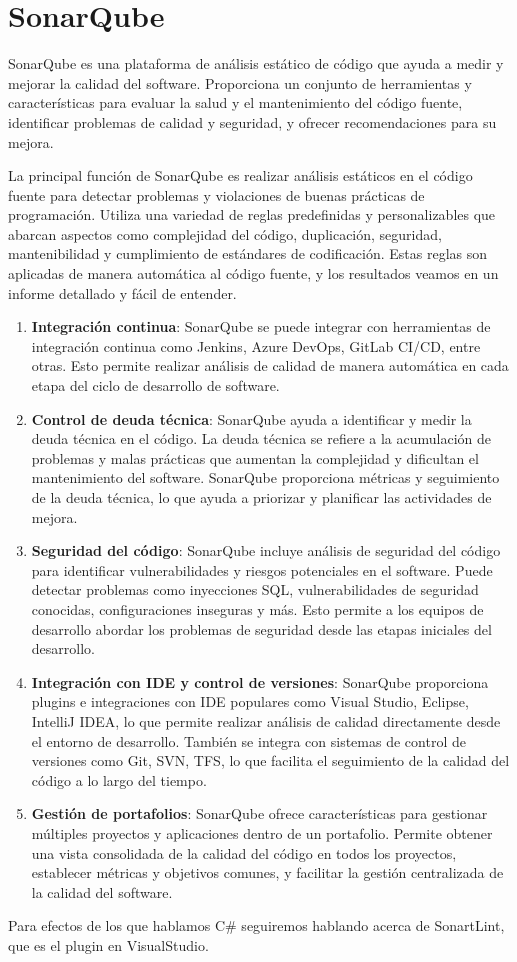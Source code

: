 \documentclass[executivepaper]{article}
\begin{document}
\section{SonarQube}
SonarQube es una plataforma de análisis estático de código que ayuda a medir y mejorar la calidad del software. Proporciona un conjunto de herramientas y características para evaluar la salud y el mantenimiento del código fuente, identificar problemas de calidad y seguridad, y ofrecer recomendaciones para su mejora.

La principal función de SonarQube es realizar análisis estáticos en el código fuente para detectar problemas y violaciones de buenas prácticas de programación. Utiliza una variedad de reglas predefinidas y personalizables que abarcan aspectos como complejidad del código, duplicación, seguridad, mantenibilidad y cumplimiento de estándares de codificación. Estas reglas son aplicadas de manera automática al código fuente, y los resultados veamos en un informe detallado y fácil de entender.

\begin{enumerate}
    \item \textbf{Integración continua}: SonarQube se puede integrar con herramientas de integración continua como Jenkins, Azure DevOps, GitLab CI/CD, entre otras. Esto permite realizar análisis de calidad de manera automática en cada etapa del ciclo de desarrollo de software.
    \item \textbf{Control de deuda técnica}: SonarQube ayuda a identificar y medir la deuda técnica en el código. La deuda técnica se refiere a la acumulación de problemas y malas prácticas que aumentan la complejidad y dificultan el mantenimiento del software. SonarQube proporciona métricas y seguimiento de la deuda técnica, lo que ayuda a priorizar y planificar las actividades de mejora.
    \item \textbf{Seguridad del código}: SonarQube incluye análisis de seguridad del código para identificar vulnerabilidades y riesgos potenciales en el software. Puede detectar problemas como inyecciones SQL, vulnerabilidades de seguridad conocidas, configuraciones inseguras y más. Esto permite a los equipos de desarrollo abordar los problemas de seguridad desde las etapas iniciales del desarrollo.
    \item \textbf{Integración con IDE y control de versiones}: SonarQube proporciona plugins e integraciones con IDE populares como Visual Studio, Eclipse, IntelliJ IDEA, lo que permite realizar análisis de calidad directamente desde el entorno de desarrollo. También se integra con sistemas de control de versiones como Git, SVN, TFS, lo que facilita el seguimiento de la calidad del código a lo largo del tiempo.
    \item \textbf{Gestión de portafolios}: SonarQube ofrece características para gestionar múltiples proyectos y aplicaciones dentro de un portafolio. Permite obtener una vista consolidada de la calidad del código en todos los proyectos, establecer métricas y objetivos comunes, y facilitar la gestión centralizada de la calidad del software.
\end{enumerate}

Para efectos de los que hablamos C\# seguiremos hablando acerca de SonartLint, que es el plugin en VisualStudio.

\subsection*{}
\end{document}

